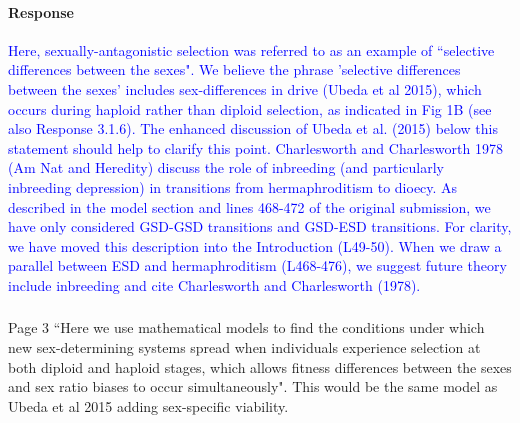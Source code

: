 \documentclass[10pt,letterpaper]{article}
\begin{document}
\noindent\paragraph{Response}
\textcolor{blue}{
Here, sexually-antagonistic selection was referred to as an example of ``selective differences between the sexes". 
We believe the phrase 'selective differences between the sexes' includes sex-differences in drive (Ubeda et al 2015), which occurs during haploid rather than diploid selection, as indicated in Fig 1B (see also Response 3.1.6).
The enhanced discussion of Ubeda et al. (2015) below this statement should help to clarify this point. 
Charlesworth and Charlesworth 1978 (Am Nat and Heredity) discuss the role of inbreeding (and particularly inbreeding depression) in transitions from hermaphroditism to dioecy. 
As described in the model section and lines 468-472 of the original submission, we have only considered GSD-GSD transitions and GSD-ESD transitions.
For clarity, we have moved this description into the Introduction (L49-50). 
When we draw a parallel between ESD and hermaphroditism (L468-476), we suggest future theory include inbreeding and cite Charlesworth and Charlesworth (1978). 
}

\noindent\subsubsection{}
Page 3 ``Here we use mathematical models to find the conditions under which new sex-determining systems spread when individuals experience selection at both diploid and haploid stages, which allows fitness differences between the sexes and sex ratio biases to occur simultaneously".
This would be the same model as Ubeda et al 2015 adding sex-specific viability.
\end{document}
